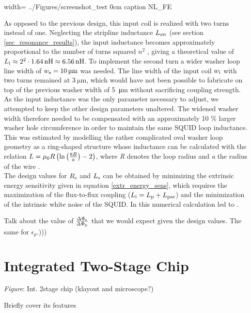 {width=\textwidth}
{../Figures/screenshot_test}
{0cm}
{caption} 
{NL_FE}

As opposed to the previous design, this input coil is realized with two turns instead of one. Neglecting the stripline inductance $L_{\rm str}$ (see section \ref{sec_resonance_results}), the input inductance becomes approximately proportional to the number of turns squared $n^2$ \cite{Ketchen1981,Jaycox1981}, giving a theoretical value of $L_{\rm i}\approx2^{2}\cdot \qty{1.64}{\nano\henry}\approx\qty{6.56}{\nano\henry}$. To implement the second turn a wider washer loop line width of $w_{\rm s}=\qty{10}{\micro\meter}$ was needed. The line width of the input coil $w_{\rm i}$ with two turns remained at $\qty{3}{\micro\meter}$, which would have not been possible to fabricate on top of the previous washer width of \qty{5}{\micro\meter} without sacrificing coupling strength. As the input inductance was the only parameter necessary to adjust, we attempted to keep the other design parameters unaltered. The widened washer width therefore needed to be compensated with an approximately 10 \% larger washer hole circumference in order to maintain the same SQUID loop inductance. This was estimated by modelling the rather complicated oval washer loop geometry as a ring-shaped structure whose inductance can be calculated with the relation $L={\rm \mu_0}R\left(\ln\left(\frac{8R}{a}\right)-2\right)$, where \textit{R} denotes the loop radius and \textit{a} the radius of the wire \cite{Dengler2016}. \\

The design values for $R_{\rm s}$ and $L_{\rm s}$ can be obtained by minimizing the extrinsic energy sensitivity given in equation \ref{extr_energy_sens}, which requires the maximization of the flux-to-flux coupling ($L_{\rm i}=L_{\rm p}+L_{\rm par}$) and the minimization of the intrinsic white noise of the SQUID. In \cite{Bauer2022} this numerical calculation led to .          


Talk about the value of $\frac{\Delta\Phi_{\rm s}}{\Delta\Phi_{\rm p}}$ that we would expect given the design values. The same for $\epsilon_p$.)))

\section{Integrated Two-Stage Chip}

\textit{Figure}: Int. 2stage chip (klayout and microscope?)

Briefly cover its features

